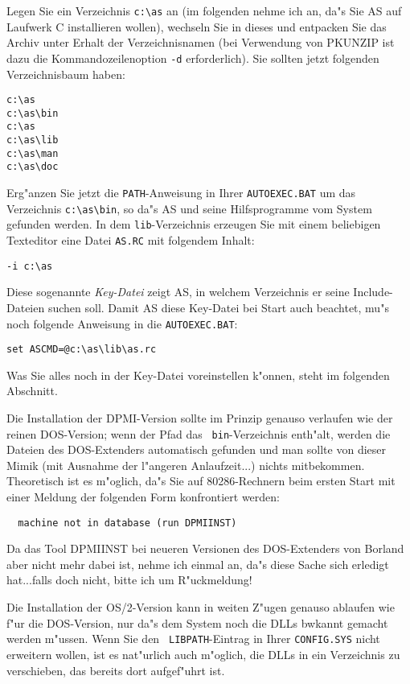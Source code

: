 \documentclass[12pt,a4paper,twoside]{report}
\newcommand{\tty}[1]{{\tt #1}}
\begin{document}
Legen Sie ein Verzeichnis \verb!c:\as! an (im folgenden nehme ich an,
da"s Sie AS auf Laufwerk C installieren wollen), wechseln Sie in dieses
und entpacken Sie das Archiv unter Erhalt der Verzeichnisnamen (bei
Verwendung von PKUNZIP ist dazu die Kommandozeilenoption \verb!-d!
erforderlich).  Sie sollten jetzt folgenden Verzeichnisbaum haben:
\begin{verbatim}
c:\as
c:\as\bin
c:\as
c:\as\lib
c:\as\man
c:\as\doc
\end{verbatim}
Erg"anzen Sie jetzt die \tty{PATH}-Anweisung in Ihrer \tty{AUTOEXEC.BAT}
um das Verzeichnis \verb!c:\as\bin!, so da"s AS und seine Hilfsprogramme
vom System gefunden werden.  In dem \tty{lib}-Verzeichnis erzeugen Sie
mit einem beliebigen Texteditor eine Datei \tty{AS.RC} mit folgendem
Inhalt:
\begin{verbatim}
-i c:\as
\end{verbatim}
Diese sogenannte {\em Key-Datei} zeigt AS, in welchem Verzeichnis er seine
Include-Dateien suchen soll.  Damit AS diese Key-Datei bei Start
auch beachtet, mu"s noch folgende Anweisung in die \tty{AUTOEXEC.BAT}:
\begin{verbatim}
set ASCMD=@c:\as\lib\as.rc
\end{verbatim}
Was Sie alles noch in der Key-Datei voreinstellen k"onnen, steht im
folgenden Abschnitt.

Die Installation der DPMI-Version  sollte im Prinzip
genauso verlaufen wie der reinen DOS-Version; wenn der Pfad das {\tt
bin}-Verzeichnis enth"alt, werden die Dateien des DOS-Extenders
automatisch gefunden und man sollte von dieser Mimik (mit Ausnahme der
l"angeren Anlaufzeit...) nichts mitbekommen.  Theoretisch ist es m"oglich,
da"s Sie auf 80286-Rechnern beim ersten Start mit einer Meldung der
folgenden Form konfrontiert werden:
\begin{verbatim}
  machine not in database (run DPMIINST)
\end{verbatim}
Da das Tool DPMIINST bei neueren Versionen des DOS-Extenders von Borland
aber nicht mehr dabei ist, nehme ich einmal an, da"s diese Sache sich
erledigt hat...falls doch nicht, bitte ich um R"uckmeldung!

Die Installation der OS/2-Version  kann in weiten
Z"ugen genauso ablaufen wie f"ur die DOS-Version, nur da"s dem System noch
die DLLs bwkannt gemacht werden m"ussen.  Wenn Sie den {\tt
LIBPATH}-Eintrag in Ihrer {\tt CONFIG.SYS} nicht erweitern wollen, ist es
nat"urlich auch m"oglich, die DLLs in ein Verzeichnis zu verschieben, das
bereits dort aufgef"uhrt ist.
\end{document}
